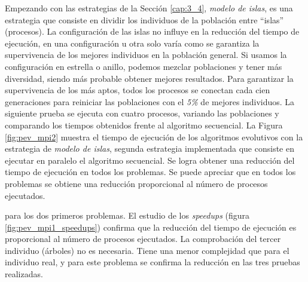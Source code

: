 		Empezando con las estrategias de la Sección \ref{cap:3_4}, \textit{modelo de islas}, es una estrategia que consiste en dividir los individuos de la población entre ``islas'' (procesos). La configuración de las islas no influye en la reducción del tiempo de ejecución, en una configuración u otra solo varía como se garantiza la supervivencia de los mejores individuos en la población general. Si usamos la configuración en estrella o anillo, podemos mezclar poblaciones y tener más diversidad, siendo más probable obtener mejores resultados. Para garantizar la supervivencia de los más aptos, todos los procesos se conectan cada cien generaciones para reiniciar las poblaciones con el \textit{5\%} de mejores individuos. La siguiente prueba se ejecuta con cuatro procesos, variando las poblaciones y comparando los tiempos obtenidos frente al algoritmo secuencial. La Figura \ref{fig:pev_mpi2} muestra el tiempo de ejecución de los algoritmos evolutivos con la estrategia de \textit{modelo de islas}, segunda estrategia implementada que consiste en ejecutar en paralelo el algoritmo secuencial. Se logra obtener una reducción del tiempo de ejecución en todos los problemas. Se puede apreciar que en todos los problemas se obtiene una reducción proporcional al número de procesos ejecutados.
		
		
		
		para los dos primeros problemas. El estudio de los \textit{speedups} (figura \ref{fig:pev_mpi1_speedups}) confirma que la reducción del tiempo de ejecución es proporcional al número de procesos ejecutados. La comprobación del tercer individuo (árboles) no es necesaria. Tiene una menor complejidad que para el individuo real, y para este problema se confirma la reducción en las tres pruebas realizadas.
		
			
		
